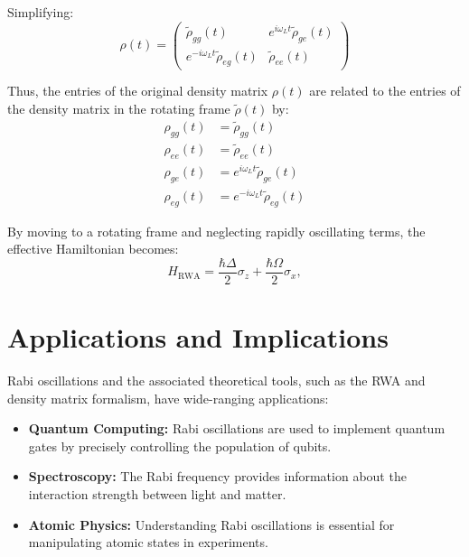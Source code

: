 Simplifying:
\begin{equation}
	\rho(t) =
	\begin{pmatrix}
		\tilde{\rho}_{gg}(t)                & e^{i\omega_L t} \tilde{\rho}_{ge}(t) \\
		e^{-i\omega_L t} \tilde{\rho}_{eg}(t) & \tilde{\rho}_{ee}(t)
	\end{pmatrix}
	\label{eq:FinalRecoveredDensityMatrix}
\end{equation}

Thus, the entries of the original density matrix $\rho(t)$ are related to the entries of the density matrix in the rotating frame $\tilde{\rho}(t)$ by:
\begin{align*}
	\rho_{gg}(t) & = \tilde{\rho}_{gg}(t)                \\
	\rho_{ee}(t) & = \tilde{\rho}_{ee}(t)                \\
	\rho_{ge}(t) & = e^{i\omega_L t} \tilde{\rho}_{ge}(t)  \\
	\rho_{eg}(t) & = e^{-i\omega_L t} \tilde{\rho}_{eg}(t)
\end{align*}



By moving to a rotating frame and neglecting rapidly oscillating terms, the effective Hamiltonian becomes:
\begin{equation}
	H_{\text{RWA}} = \frac{\hbar \Delta}{2} \sigma_z + \frac{\hbar \Omega}{2} \sigma_x,
	\label{eq:RWAHamiltonian}
\end{equation}






\section{Applications and Implications}

Rabi oscillations and the associated theoretical tools, such as the RWA and density matrix formalism, have wide-ranging applications:
\begin{itemize}
	\item \textbf{Quantum Computing:} Rabi oscillations are used to implement quantum gates by precisely controlling the population of qubits.
	\item \textbf{Spectroscopy:} The Rabi frequency provides information about the interaction strength between light and matter.
	\item \textbf{Atomic Physics:} Understanding Rabi oscillations is essential for manipulating atomic states in experiments.
\end{itemize}

